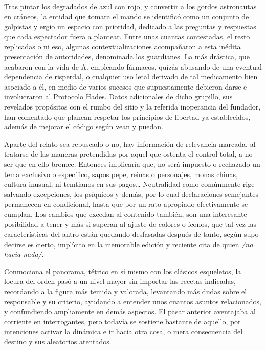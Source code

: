 \documentclass[
]{book}
\begin{document}
Tras pintar los degradados de azul con rojo, y convertir a los gordos astronautas en cráneos, la entidad que tomara el mando se identificó como un conjunto de golpistas y ergio un espacio con prioridad, dedicado a las preguntas y respuestas que cada espectador fuera a plantear. Entre unas cuantas contestadas, el resto replicadas o ni eso, algunas contextualizaciones acompañaron a esta inédita presentación de autoridades, denominada los guardianes. La más drástica, que acabaron con la vida de A. empleando fármacos, quizás abusando de una eventual dependencia de risperdal, o cualquier uso letal derivado de tal medicamento bien asociado a él, en medio de varios sucesos que supuestamente debieron darse e involucraron al Protocolo Hades. Datos adicionales de dicho grupillo, sus revelados propósitos con el rumbo del sitio y la referida inoperancia del fundador, han comentado que planean respetar los principios de libertad ya establecidos, además de mejorar el código según vean y puedan.

Aparte del relato sea rebuscado o no, hay información de relevancia marcada, al tratarse de las maneras pretendidas por aquel que ostenta el control total, a no ser que en ello bromee. Entonces implicaría que, no será impuesto o rechazado un tema exclusivo o específico, sapos pepe, reinas o personajes, monas chinas, cultura inusual, ni temtianos en sus pagos\ldots{} Neutralidad como comúnmente rige salvando excepciones, los psíquicos y demás, por lo cual declaraciones semejantes permanecen en condicional, hasta que por un rato apropiado efectivamente se cumplan. Los cambios que excedan al contenido también, son una interesante posibilidad a tener y más si superan al ajuste de colores o íconos, que tal vez las características del antro están quedando desfasadas después de tanto, según supo decirse es cierto, implícito en la memorable edición y reciente cita de quien \emph{/no hacia nada/}.

Conmociona el panorama, tétrico en sí mismo con los clásicos esqueletos, la locura del orden pasó a un nivel mayor sin importar las recetas indicadas, recordando a la figura más temida y valorada, levantando más dudas sobre el responsable y su criterio, ayudando a entender unos cuantos asuntos relacionados, y confundiendo ampliamente en demás aspectos. El pasar anterior aventajaba al corriente en interrogantes, pero todavía se sostiene bastante de aquello, por intenciones activar la dinámica e ir hacia otra cosa, o mera consecuencia del destino y sus aleatorios atentados.
\end{document}
